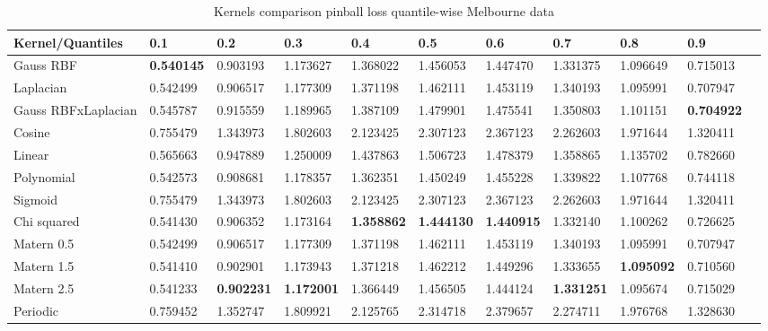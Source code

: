 \begin{table}[!h]
    \caption{Kernels comparison pinball loss quantile-wise Melbourne data}
    \label{tab:kernel pinball comparison quantile-wise}
    \begin{adjustbox}{width=\textwidth}
    \begin{tabular}{lllllllllll}
    \toprule
    Kernel/Quantiles & 0.1 & 0.2 & 0.3 & 0.4 & 0.5 & 0.6 & 0.7 & 0.8 & 0.9 \\
    \midrule
    Gauss RBF &  \textbf{0.540145} &
    0.903193 &
    1.173627 &
    1.368022 &
    1.456053 &
    1.447470 &
    1.331375 &
    1.096649 &
    0.715013 \\
    Laplacian &  0.542499 &
    0.906517 &
    1.177309 &
    1.371198 &
    1.462111 &
    1.453119 &
    1.340193 &
    1.095991 &
    0.707947 \\
    Gauss RBFxLaplacian &0.545787 &
    0.915559 &
    1.189965 &
    1.387109 &
    1.479901 &
    1.475541 &
    1.350803 &
    1.101151 &
    \textbf{0.704922} \\
    Cosine & 0.755479 &
    1.343973 &
    1.802603 &
    2.123425 &
    2.307123 &
    2.367123 &
    2.262603 &
    1.971644 &
    1.320411 \\
    Linear &  0.565663 &
    0.947889 &
    1.250009 &
    1.437863 &
    1.506723 &
    1.478379 &
    1.358865 &
    1.135702 &
    0.782660   \\
    Polynomial &   0.542573 &
    0.908681 &
    1.178357 &
    1.362351 &
    1.450249 &
    1.455228 &
    1.339822 &
    1.107768 &
    0.744118  \\
    Sigmoid &   0.755479 &
    1.343973 &
    1.802603 &
    2.123425 &
    2.307123 &
    2.367123 &
    2.262603 &
    1.971644 &
    1.320411          \\
    Chi squared &   0.541430 &
    0.906352 &
    1.173164 &
    \textbf{1.358862} &
    \textbf{1.444130} &
    \textbf{1.440915} &
    1.332140 &
    1.100262 &
    0.726625     \\
    Matern 0.5 &  0.542499 &
    0.906517 &
    1.177309 &
    1.371198 &
    1.462111 &
    1.453119 &
    1.340193 &
    1.095991 &
    0.707947 \\
    Matern 1.5 &  0.541410 &
    0.902901 &
    1.173943 &
    1.371218 &
    1.462212 &
    1.449296 &
    1.333655 &
    \textbf{1.095092} &
    0.710560 \\
    Matern 2.5 &  0.541233 &
    \textbf{0.902231} &
    \textbf{1.172001} &
    1.366449 &
    1.456505 &
    1.444124 &
    \textbf{1.331251} &
    1.095674 &
    0.715029 \\
    Periodic  & 0.759452 &
    1.352747 &
    1.809921 &
    2.125765 &
    2.314718 &
    2.379657 &
    2.274711 &
    1.976768 &
    1.328630 \\
    \bottomrule
    \end{tabular}
    \end{adjustbox}
\end{table}



